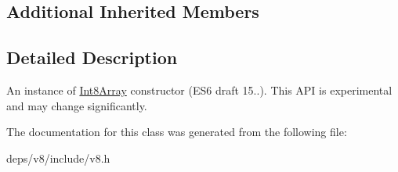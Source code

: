 \subsection*{Additional Inherited Members}


\subsection{Detailed Description}
An instance of \hyperlink{classv8_1_1_int8_array}{Int8\+Array} constructor (E\+S6 draft 15..). This A\+P\+I is experimental and may change significantly. 

The documentation for this class was generated from the following file\+:\begin{DoxyCompactItemize}
\item 
deps/v8/include/v8.\+h\end{DoxyCompactItemize}
